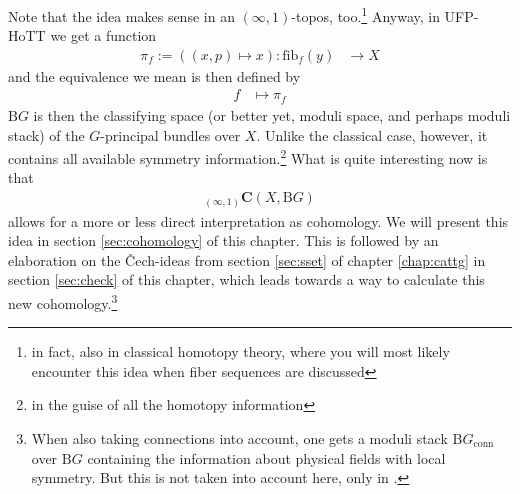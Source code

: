 Note that the idea makes sense in an $(\infty,1)$-topos, too.\footnote{in fact, also in classical homotopy theory, where you will most likely encounter this idea when fiber sequences are discussed} Anyway, in UFP-HoTT we get a function
\begin{align*}
  \pi_{f}
  :=
  \left(
    (x,p)
    \mapsto
    x
  \right)
  \colon
  \mathrm{fib}_{f}(y)
  &\rightarrow
  X
\end{align*}
and the equivalence we mean is then defined by
\begin{align*}
  f
  &\mapsto
  \pi_{f}
\end{align*}
$\mathrm{B}G$ is then the classifying space (or better yet, moduli space, and perhaps moduli stack) of the $G$-principal bundles over $X$.
Unlike the classical case, however, it contains all available symmetry information.\footnote{in the guise of all the homotopy information} What is quite interesting now is that
\begin{align*}
  {}_{(\infty,1)}\mathbf{C}
  \left(
    X,
    \mathrm{B}G
  \right)
\end{align*}
allows for a more or less direct interpretation as cohomology.
We will present this idea in section \ref{sec:cohomology} of this chapter.
This is followed by an elaboration on the {\glqq}\v{C}ech-ideas{\grqq} from section \ref{sec:sset} of chapter \ref{chap:cattg} in section \ref{sec:check} of this chapter, which leads towards a way to {\glqq}calculate{\grqq} this new cohomology.\footnote{When also taking connections into account, one gets a moduli stack $\mathrm{B}G_{\textrm{conn}}$ {\glqq}over{\grqq} $\mathrm{B}G$ containing the information about physical fields with local symmetry.
But this is not taken into account here, only in \cite{a565d200}.}
